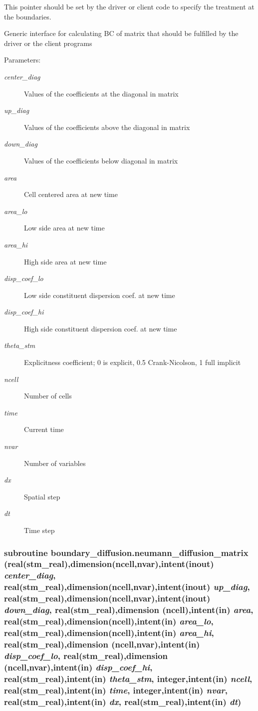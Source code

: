 This pointer should be set by the driver or client code to specify the treatment at the boundaries. 

Generic interface for calculating BC of matrix that should be fulfilled by the driver or the client programs \begin{Desc}
\item[Parameters:]
\begin{description}
\item[{\em center\_\-diag}]Values of the coefficients at the diagonal in matrix\item[{\em up\_\-diag}]Values of the coefficients above the diagonal in matrix\item[{\em down\_\-diag}]Values of the coefficients below diagonal in matrix\item[{\em area}]Cell centered area at new time \item[{\em area\_\-lo}]Low side area at new time\item[{\em area\_\-hi}]High side area at new time \item[{\em disp\_\-coef\_\-lo}]Low side constituent dispersion coef. at new time\item[{\em disp\_\-coef\_\-hi}]High side constituent dispersion coef. at new time\item[{\em theta\_\-stm}]Explicitness coefficient; 0 is explicit, 0.5 Crank-Nicolson, 1 full implicit \item[{\em ncell}]Number of cells\item[{\em time}]Current time\item[{\em nvar}]Number of variables\item[{\em dx}]Spatial step \item[{\em dt}]Time step \end{description}
\end{Desc}
\hypertarget{a00051_35936f4856e0472bc61d1deef432ff3e}{
\subsubsection[{neumann\_\-diffusion\_\-matrix}]{\setlength{\rightskip}{0pt plus 5cm}subroutine boundary\_\-diffusion.neumann\_\-diffusion\_\-matrix (real(stm\_\-real),dimension(ncell,nvar),intent(inout) {\em center\_\-diag}, \/  real(stm\_\-real),dimension(ncell,nvar),intent(inout) {\em up\_\-diag}, \/  real(stm\_\-real),dimension(ncell,nvar),intent(inout) {\em down\_\-diag}, \/  real(stm\_\-real),dimension (ncell),intent(in) {\em area}, \/  real(stm\_\-real),dimension(ncell),intent(in) {\em area\_\-lo}, \/  real(stm\_\-real),dimension(ncell),intent(in) {\em area\_\-hi}, \/  real(stm\_\-real),dimension (ncell,nvar),intent(in) {\em disp\_\-coef\_\-lo}, \/  real(stm\_\-real),dimension (ncell,nvar),intent(in) {\em disp\_\-coef\_\-hi}, \/  real(stm\_\-real),intent(in) {\em theta\_\-stm}, \/  integer,intent(in) {\em ncell}, \/  real(stm\_\-real),intent(in) {\em time}, \/  integer,intent(in) {\em nvar}, \/  real(stm\_\-real),intent(in) {\em dx}, \/  real(stm\_\-real),intent(in) {\em dt})}}
